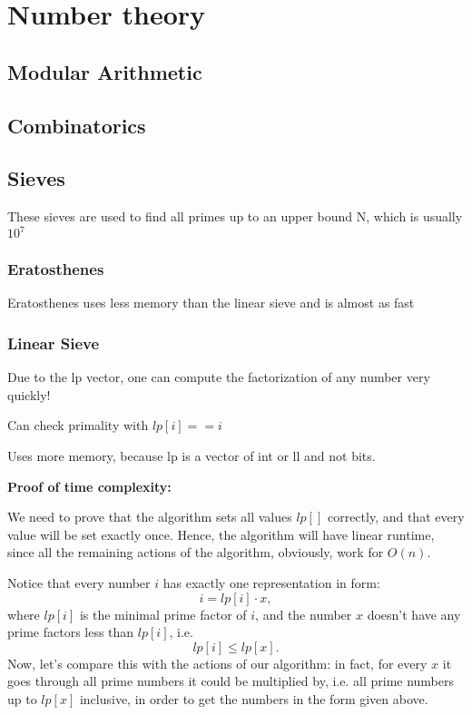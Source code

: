 \chapter{Number theory}

\section{Modular Arithmetic}


\section{Combinatorics}


\section{Sieves}

    These sieves are used to find all primes up to an upper bound N, which is usually $10^7$

    \subsection{Eratosthenes}

        Eratosthenes uses less memory than the linear sieve and is almost as fast


    \subsection{Linear Sieve}

        Due to the lp vector, one can compute the factorization of any number very quickly!

        Can check primality with $lp[i] == i$

        Uses more memory, because lp is a vector of int or ll and not bits.

        \textbf{Proof of time complexity:}

        We need to prove that the algorithm sets all values
        $lp[]$ correctly, and that every value will be set exactly once. 
        Hence, the algorithm will have linear runtime, since all the remaining actions of the algorithm, obviously, work for
        $O(n)$.

        Notice that every number $i$ has exactly one representation in form:
        $$i = lp [i] \cdot x,$$
        where 
        $lp [i]$ is the minimal prime factor of 
        $i$, and the number 
        $x$ doesn't have any prime factors less than 
        $lp [i]$, i.e.
        $$lp [i] \le lp [x].$$
        Now, let's compare this with the actions of our algorithm: in fact, for every 
        $x$ it goes through all prime numbers it could be multiplied by, i.e. all prime numbers up to 
        $lp [x]$ inclusive, in order to get the numbers in the form given above.

